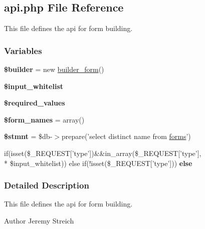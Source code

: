 \hypertarget{api_8php}{\subsection{api.\-php File Reference}
\label{api_8php}
}


This file defines the api for form building.  


\subsubsection*{Variables}
\begin{DoxyCompactItemize}
\item 
\hypertarget{api_8php_a03b3894f94a4a13f6de58cc6150584f3}{{\bfseries \$builder} = new \hyperlink{classbuilder__form}{builder\-\_\-form}()}\label{api_8php_a03b3894f94a4a13f6de58cc6150584f3}

\item 
{\bfseries \$input\-\_\-whitelist}
\item 
{\bfseries \$required\-\_\-values}
\item 
\hypertarget{api_8php_a48d91bd968259d1544bb78a8b0ffe541}{{\bfseries \$form\-\_\-names} = array()}\label{api_8php_a48d91bd968259d1544bb78a8b0ffe541}

\item 
\hypertarget{api_8php_a172a3ce731ebb53eb004cf719f977d6d}{{\bfseries \$stmnt} = \$db-\/$>$prepare('select distinct name from \hyperlink{classforms}{forms}')}\label{api_8php_a172a3ce731ebb53eb004cf719f977d6d}

\item 
if(isset(\$\-\_\-\-R\-E\-Q\-U\-E\-S\-T\mbox{[}'type'\mbox{]})\&\&in\-\_\-array(\$\-\_\-\-R\-E\-Q\-U\-E\-S\-T\mbox{[}'type'\mbox{]}, \\*
\$input\-\_\-whitelist)) else if(!isset(\$\-\_\-\-R\-E\-Q\-U\-E\-S\-T\mbox{[}'type'\mbox{]})) {\bfseries else}
\end{DoxyCompactItemize}


\subsubsection{Detailed Description}
This file defines the api for form building. \begin{DoxyAuthor}{Author}
Jeremy Streich 
\end{DoxyAuthor}


